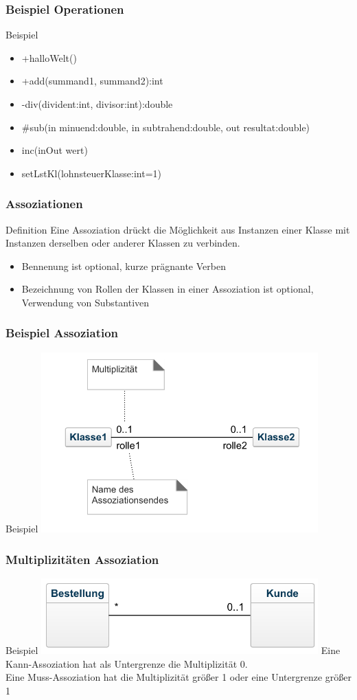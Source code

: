 \begin{frame}
\frametitle{Beispiel Operationen}
	Beispiel
	\begin{itemize}
		\item +halloWelt()
		\item +add(summand1, summand2):int
		\item -div(divident:int, divisor:int):double
		\item \#sub(in minuend:double, in subtrahend:double, out resultat:double)
		\item inc(inOut wert)
		\item setLstKl(lohnsteuerKlasse:int=1)
	\end{itemize}
\end{frame}

\begin{frame}
\frametitle{Assoziationen}
	\begin{block}{Definition}
		Eine Assoziation drückt die Möglichkeit aus Instanzen einer Klasse mit Instanzen derselben oder
		anderer Klassen zu verbinden.
	\end{block}
	\begin{itemize}
		\item Bennenung ist optional, kurze prägnante Verben
		\item Bezeichnung von Rollen der Klassen in einer Assoziation ist optional, Verwendung von Substantiven
	\end{itemize}
\end{frame}

\begin{frame}
\frametitle{Beispiel Assoziation}
	Beispiel
	\center
	\includegraphics[width=0.8\textwidth,
	keepaspectratio=true]{bilder/assoziation.png}
\end{frame}

\begin{frame}
\frametitle{Multiplizitäten Assoziation}
	Beispiel
	\center
	\includegraphics[width=0.8\textwidth,
	keepaspectratio=true]{bilder/asso_multi.png}
	\bigskip
	Eine Kann-Assoziation hat als Untergrenze die Multiplizität 0.\\
	Eine Muss-Assoziation hat die Multiplizität größer 1 oder eine Untergrenze größer 1
\end{frame}


